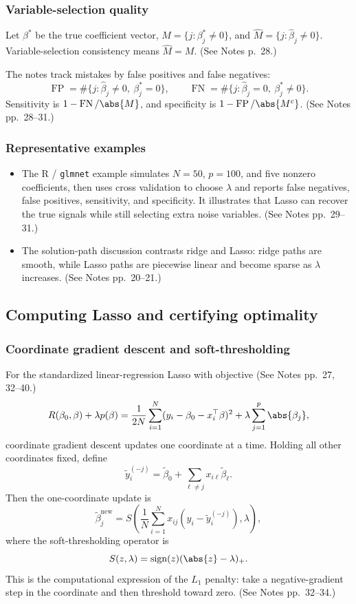 \subsubsection{Variable-selection quality}
Let $\beta^*$ be the true coefficient vector, $M=\{j:\beta_j^*\ne0\}$, and $\hat M=\{j:\hat\beta_j\ne0\}$. Variable-selection consistency means $\hat M=M$. (See Notes p.~28.)

The notes track mistakes by false positives and false negatives:
\[
\operatorname{FP}=\#\{j:\hat\beta_j\ne0,\ \beta_j^*=0\},
\qquad
\operatorname{FN}=\#\{j:\hat\beta_j=0,\ \beta_j^*\ne0\}.
\]
Sensitivity is $1-\operatorname{FN}/\abs{M}$, and specificity is $1-\operatorname{FP}/\abs{M^c}$. (See Notes pp.~28--31.)

\subsubsection{Representative examples}
\begin{itemize}
    \item The R / \texttt{glmnet} example simulates $N=50$, $p=100$, and five nonzero coefficients, then uses cross validation to choose $\lambda$ and reports false negatives, false positives, sensitivity, and specificity. It illustrates that Lasso can recover the true signals while still selecting extra noise variables. (See Notes pp.~29--31.)
    \item The solution-path discussion contrasts ridge and Lasso: ridge paths are smooth, while Lasso paths are piecewise linear and become sparse as $\lambda$ increases. (See Notes pp.~20--21.)
\end{itemize}

\subsection{Computing Lasso and certifying optimality}
\subsubsection{Coordinate gradient descent and soft-thresholding}
For the standardized linear-regression Lasso with objective (See Notes pp.~27, 32--40.)
\[
R(\beta_0,\beta)+\lambda p(\beta)
=\frac{1}{2N}\sum_{i=1}^N(y_i-\beta_0-x_i^\top\beta)^2
+\lambda\sum_{j=1}^p\abs{\beta_j},
\]
coordinate gradient descent updates one coordinate at a time. Holding all other coordinates fixed, define
\[
\tilde y_i^{(-j)}=\tilde\beta_0+\sum_{\ell\ne j}x_{i\ell}\tilde\beta_\ell.
\]
Then the one-coordinate update is
\[
\tilde\beta_j^{\mathrm{new}}
=S\left(\frac{1}{N}\sum_{i=1}^N x_{ij}(y_i-\tilde y_i^{(-j)}),\lambda\right),
\]
where the soft-thresholding operator is
\[
S(z,\lambda)=\operatorname{sign}(z)(\abs{z}-\lambda)_+.
\]
This is the computational expression of the $L_1$ penalty: take a negative-gradient step in the coordinate and then threshold toward zero. (See Notes pp.~32--34.)

